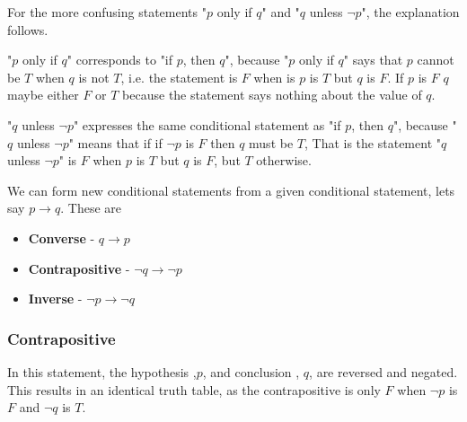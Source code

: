 \documentclass[12pt letter]{report}
\begin{document}
For the more confusing statements "$p$ only if $q$" and "$q$ unless $\neg p$", the explanation follows.

"$p$ only if $q$" corresponds to "if $p$, then $q$", because "$p$ only if $q$" says that $p$ cannot be $T$ when $q$ is not
$T$, i.e. the statement is $F$ when is $p$ is $T$ but $q$ is $F$. If $p$ is $F$ $q$ maybe either $F$ or $T$ because the
statement says nothing about the value of $q$.

"$q$ unless $\neg p$" expresses the same conditional statement as "if $p$, then $q$", because "$q$ unless $\neg p$"
means that if if $\neg p$ is $F$ then $q$ must be $T$, That is the statement "$q$ unless $\neg p$" is $F$ when $p$ is
$T$ but $q$ is $F$, but $T$ otherwise.


We can form new conditional statements from a given conditional statement, lets say $p \to q$. These are

\begin{itemize}
	\item \textbf{Converse} - $q \to  p$
	\item \textbf{Contrapositive} - $\neg q \to \neg p$
	\item \textbf{Inverse} - $\neg p \to \neg q$
\end{itemize}


\subsubsection{Contrapositive}


In this statement, the hypothesis ,$p$, and conclusion , $q$, are reversed and negated. This results in an identical
truth table, as the contrapositive is only $F$ when $\neg p$ is $F$ and $\neg q$ is $T$.
\end{document}

